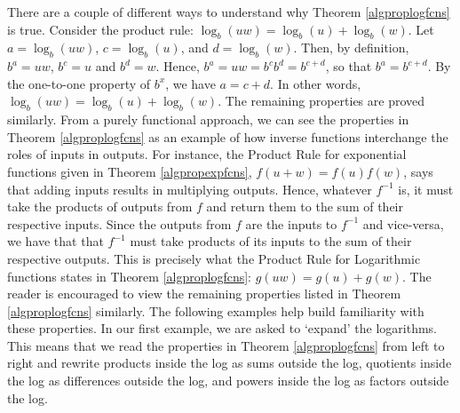 
\smallskip

There are a couple of different ways to understand why Theorem \ref{algproplogfcns} is true.  Consider the product rule: $\log_{b}(uw) = \log_{b}(u) + \log_{b}(w)$.  Let $a = \log_{b}(uw)$, $c = \log_{b}(u)$, and $d = \log_{b}(w)$.  Then, by definition, $b^{a} = uw$, $b^{c} = u$ and $b^{d} = w$.  Hence, $b^{a} = uw = b^{c} b^{d} = b^{c+d}$, so that $b^{a} = b^{c+d}$.  By the one-to-one property of $b^{x}$, we have $a = c+d$. In other words, $\log_{b}(uw) = \log_{b}(u) + \log_{b}(w)$.  The remaining properties are proved similarly.  From a purely functional approach, we can see the properties in Theorem \ref{algproplogfcns} as an example of how inverse functions interchange the roles of inputs in outputs.  For instance, the Product Rule for exponential functions given in Theorem  \ref{algpropexpfcns}, $f(u+w) = f(u)f(w)$, says that adding inputs results in multiplying outputs.  Hence, whatever $f^{-1}$ is, it must take the products of outputs from $f$ and return them to the sum of their respective inputs.  Since the outputs from $f$ are the inputs to $f^{-1}$ and vice-versa, we have that that $f^{-1}$ must take products of its inputs to the sum of their respective outputs. This is precisely what the Product Rule for Logarithmic functions states in Theorem \ref{algproplogfcns}:  $g(uw) = g(u) + g(w)$.  The reader is encouraged to view the remaining properties listed in Theorem \ref{algproplogfcns} similarly.  The following examples help build familiarity with these properties.  In our first example, we are asked to `expand' the logarithms.  This means that we read the properties in Theorem \ref{algproplogfcns} from left to right and rewrite products inside the log as sums outside the log, quotients inside the log as  differences outside the log, and powers inside the log as factors outside the log.


